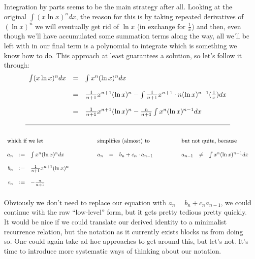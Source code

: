 \documentclass[twoside]{article}
\begin{document}
Integration by parts seems to be the main strategy after all. Looking at the original $ \int (x\ln x)^n dx $,
the reason for this is by taking repeated derivatives of $ (\ln x)^n $ we will eventually get rid of $ \ln x $
(in exchange for $ \frac{1}{x} $) and then, even though we'll have accumulated some summation terms along the way,
all we'll be left with in our final term is a polynomial to integrate which is something we know how to do.
This approach at least guarantees a solution, so let's follow it through:
$$ \begin{array}{rcl}
\int (x\ln x)^n dx	& = & \int x^n(\ln x)^n dx											\\
																	\\
			& = & \frac{1}{n+1}x^{n+1}(\ln x)^n - \int\frac{1}{n+1}x^{n+1}\cdot n(\ln x)^{n-1}(\frac{1}{x}) dx		\\
																	\\
			& = & \frac{1}{n+1}x^{n+1}(\ln x)^n - \frac{n}{n+1}\int x^n(\ln x)^{n-1} dx					\\
																	\\
\hline																	\\
\end{array} $$
$$ %
\begin{array}{rclrclrcl}
\multicolumn{3}{l}{\mbox{which if we let}}& \multicolumn{3}{l}{\qquad\mbox{simplifies (almost) to}}&
\multicolumn{3}{l}{\qquad\mbox{but not quite, because}}											\\
    &	 &					\qquad&\qquad	&   &				\qquad&\qquad	 &	&				\\
a_n & := & \int x^n(\ln x)^n dx			\qquad&\qquad a_n& = & b_n + c_n\cdot a_{n-1}	\qquad&\qquad a_{n-1}& \neq & \int x^n(\ln x)^{n-1} dx	\\
    &	 &					\qquad&\qquad	&   &				\qquad&\qquad	 &	&				\\
b_n & := & \frac{1}{n+1}x^{n+1}(\ln x)^n	\qquad&\qquad 	&   &				\qquad&\qquad 	 &	&				\\
    &	 &					\qquad&\qquad	&   &				\qquad&\qquad	 &	&				\\
c_n & := & - \frac{n}{n+1}			\qquad&\qquad 	&   &				\qquad&\qquad 	 &	&				\\
																	\\
\end{array} $$
Obviously we don't need to replace our equation with $ a_n=b_n+c_na_{n-1} $, we could continue with the raw ``low-level''
form, but it gets pretty tedious pretty quickly. It would be nice if we could translate our derived identity to a minimalist
recurrence relation, but the notation as it currently exists blocks us from doing so. One could again take ad-hoc approaches
to get around this, but let's not. It's time to introduce more systematic ways of thinking about our notation.
\end{document}
